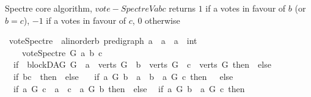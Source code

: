 \begin{isabellebody}
\begin{isamarkuptext}%
Spectre core algorithm, $vote-Spectre V a b c$ returns 
     $1$ if a votes in favour of $b$ (or $b = c$),
     $-1$ if a votes in favour of $c$, $0$ otherwise%
\end{isamarkuptext}\isamarkuptrue%
\isamarkupfalse%
\ vote{\isacharunderscore}{\kern0pt}Spectre\ {\isacharcolon}{\kern0pt}{\isacharcolon}{\kern0pt}\ {\isachardoublequoteopen}{\isacharparenleft}{\kern0pt}{\isacharprime}{\kern0pt}a{\isacharcolon}{\kern0pt}{\isacharcolon}{\kern0pt}linorder{\isacharcomma}{\kern0pt}{\isacharprime}{\kern0pt}b{\isacharparenright}{\kern0pt}\ pre{\isacharunderscore}{\kern0pt}digraph\ {\isasymRightarrow}{\isacharprime}{\kern0pt}a\ {\isasymRightarrow}\ {\isacharprime}{\kern0pt}a\ {\isasymRightarrow}\ {\isacharprime}{\kern0pt}a\ {\isasymRightarrow}\ int{\isachardoublequoteclose}\ \isanewline
\ \ \isanewline
\ \ \ \ {\isachardoublequoteopen}vote{\isacharunderscore}{\kern0pt}Spectre\ G\ a\ b\ c\ {\isacharequal}{\kern0pt}\ {\isacharparenleft}{\kern0pt}\isanewline
\ \ if\ {\isacharparenleft}{\kern0pt}{\isasymnot}\ blockDAG\ G\ {\isasymor}\ a\ {\isasymnotin}\ verts\ G\ {\isasymor}\ b\ {\isasymnotin}\ verts\ G\ {\isasymor}\ c\ {\isasymnotin}\ verts\ G{\isacharparenright}{\kern0pt}\ then\ {}\ else\ \isanewline
\ \ if\ {\isacharparenleft}{\kern0pt}b{\isacharequal}{\kern0pt}c{\isacharparenright}{\kern0pt}\ \ then\ {}\ else\ \isanewline
\ \ if\ {\isacharparenleft}{\kern0pt}{\isacharparenleft}{\kern0pt}{\isacharparenleft}{\kern0pt}a\ {\isasymrightarrow}\isactrlsup {\isacharplus}{\kern0pt}\isactrlbsub G\isactrlesub \ b{\isacharparenright}{\kern0pt}\ {\isasymor}\ a\ {\isacharequal}{\kern0pt}\ b{\isacharparenright}{\kern0pt}\ {\isasymand}\ {\isasymnot}{\isacharparenleft}{\kern0pt}a\ {\isasymrightarrow}\isactrlsup {\isacharplus}{\kern0pt}\isactrlbsub G\isactrlesub \ c{\isacharparenright}{\kern0pt}{\isacharparenright}{\kern0pt}\ then\ {}\ \ else\isanewline
\ \ if\ {\isacharparenleft}{\kern0pt}{\isacharparenleft}{\kern0pt}{\isacharparenleft}{\kern0pt}a\ {\isasymrightarrow}\isactrlsup {\isacharplus}{\kern0pt}\isactrlbsub G\isactrlesub \ c{\isacharparenright}{\kern0pt}\ {\isasymor}\ a\ {\isacharequal}{\kern0pt}\ c{\isacharparenright}{\kern0pt}\ {\isasymand}\ {\isasymnot}{\isacharparenleft}{\kern0pt}a\ {\isasymrightarrow}\isactrlsup {\isacharplus}{\kern0pt}\isactrlbsub G\isactrlesub \ b{\isacharparenright}{\kern0pt}{\isacharparenright}{\kern0pt}\ then\ {\isacharminus}{\kern0pt}{}\ else\isanewline
\ \ if\ {\isacharparenleft}{\kern0pt}{\isacharparenleft}{\kern0pt}a\ {\isasymrightarrow}\isactrlsup {\isacharplus}{\kern0pt}\isactrlbsub G\isactrlesub \ b{\isacharparenright}{\kern0pt}\ {\isasymand}\ {\isacharparenleft}{\kern0pt}a\ {\isasymrightarrow}\isactrlsup {\isacharplus}{\kern0pt}\isactrlbsub G\isactrlesub \ c{\isacharparenright}{\kern0pt}{\isacharparenright}{\kern0pt}\ then\ \isanewline

\end{isabellebody}
